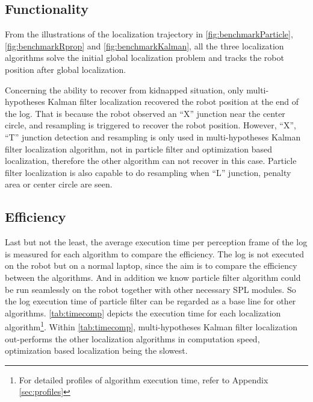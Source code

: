 \subsection{Functionality}
\label{sub:Functionality}

From the illustrations of the localization trajectory in \autoref{fig:benchmarkParticle}, \autoref{fig:benchmarkRprop} and \autoref{fig:benchmarkKalman}, all the three localization algorithms solve the initial global localization problem and tracks the robot position after global localization. 

Concerning the ability to recover from kidnapped situation, only multi-hypotheses Kalman filter localization recovered the robot position at the end of the log. That is because the robot observed an ``X'' junction near the center circle, and resampling is triggered to recover the robot position. However, ``X'', ``T'' junction detection and resampling is only used in multi-hypotheses Kalman filter localization algorithm, not in particle filter and optimization based localization, therefore the other algorithm can not recover in this case. Particle filter localization is also capable to do resampling when ``L'' junction, penalty area or center circle are seen.

\subsection{Efficiency}
\label{sub:Efficiency}
Last but not the least, the average execution time per perception frame of the log is measured for each algorithm to compare the efficiency. The log is not executed on the robot but on a normal laptop, since the aim is to compare the efficiency between the algorithms. And in addition we know particle filter algorithm could be run seamlessly on the robot together with other necessary \gls{SPL} modules. So the log execution time of particle filter can be regarded as a base line for other algorithms. \autoref{tab:timecomp} depicts the execution time for each localization algorithm\footnote{For detailed profiles of algorithm execution time, refer to Appendix \ref{sec:profiles}}. Within \autoref{tab:timecomp}, multi-hypotheses Kalman filter localization out-performs the other localization algorithms in computation speed, optimization based localization being the slowest.




